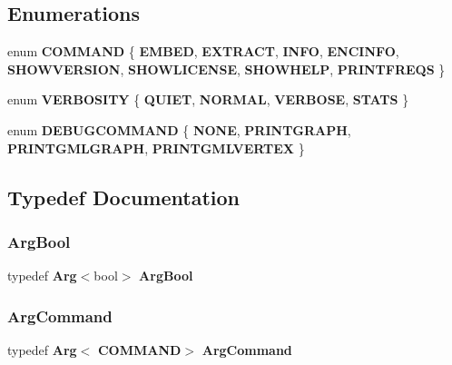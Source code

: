 \subsection*{Enumerations}
\begin{DoxyCompactItemize}
\item 
enum \textbf{ C\+O\+M\+M\+A\+ND} \{ \newline
\textbf{ E\+M\+B\+ED}, 
\textbf{ E\+X\+T\+R\+A\+CT}, 
\textbf{ I\+N\+FO}, 
\textbf{ E\+N\+C\+I\+N\+FO}, 
\newline
\textbf{ S\+H\+O\+W\+V\+E\+R\+S\+I\+ON}, 
\textbf{ S\+H\+O\+W\+L\+I\+C\+E\+N\+SE}, 
\textbf{ S\+H\+O\+W\+H\+E\+LP}, 
\textbf{ P\+R\+I\+N\+T\+F\+R\+E\+QS}
 \}
\item 
enum \textbf{ V\+E\+R\+B\+O\+S\+I\+TY} \{ \textbf{ Q\+U\+I\+ET}, 
\textbf{ N\+O\+R\+M\+AL}, 
\textbf{ V\+E\+R\+B\+O\+SE}, 
\textbf{ S\+T\+A\+TS}
 \}
\item 
enum \textbf{ D\+E\+B\+U\+G\+C\+O\+M\+M\+A\+ND} \{ \textbf{ N\+O\+NE}, 
\textbf{ P\+R\+I\+N\+T\+G\+R\+A\+PH}, 
\textbf{ P\+R\+I\+N\+T\+G\+M\+L\+G\+R\+A\+PH}, 
\textbf{ P\+R\+I\+N\+T\+G\+M\+L\+V\+E\+R\+T\+EX}
 \}
\end{DoxyCompactItemize}


\subsection{Typedef Documentation}
\mbox{\label{Arg_8h_a0b8579b72a7684d7ce9a3c8ee02eae1b}} 
\subsubsection{Arg\+Bool}
{\footnotesize\ttfamily typedef \textbf{ Arg}$<$bool$>$ \textbf{ Arg\+Bool}}

\mbox{\label{Arg_8h_af3e523e3e49b810a8dc487f007b2743f}} 
\subsubsection{Arg\+Command}
{\footnotesize\ttfamily typedef \textbf{ Arg}$<$\textbf{ C\+O\+M\+M\+A\+ND}$>$ \textbf{ Arg\+Command}}

\mbox{\label{Arg_8h_a4b9eb8e98d23251991a6eccc73446306}} 
